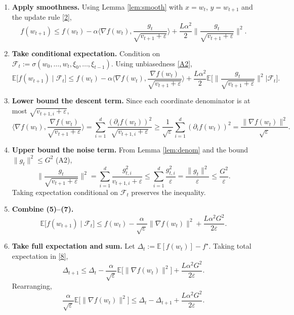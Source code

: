 \documentclass{article}
\newcommand{\E}{\mathbb{E}}
\begin{document}
\begin{enumerate}[label=[Step \arabic*], leftmargin=*, nosep]
\item \textbf{Apply smoothness.}  
Using Lemma \ref{lem:smooth} with $x=w_t$, $y=w_{t+1}$ and the update rule \eqref{2},
\[
f(w_{t+1})\le f(w_t)-\alpha\Big\langle\nabla f(w_t),\frac{g_t}{\sqrt{v_{t+1}+\varepsilon}}\Big\rangle
+\frac{L\alpha^2}{2}\Big\|\frac{g_t}{\sqrt{v_{t+1}+\varepsilon}}\Big\|^2.
\tag{4}
\]

\item \textbf{Take conditional expectation.}  
Condition on $\mathcal{F}_t:=\sigma(w_0,\dots,w_t,\xi_0,\dots,\xi_{t-1})$.
Using unbiasedness \eqref{A2},
\[
\E\!\big[f(w_{t+1})\mid\mathcal{F}_t\big]
\le f(w_t)-\alpha\Big\langle\nabla f(w_t),\frac{\nabla f(w_t)}{\sqrt{v_{t+1}+\varepsilon}}\Big\rangle
+\frac{L\alpha^2}{2}\E\!\Big[\Big\|\frac{g_t}{\sqrt{v_{t+1}+\varepsilon}}\Big\|^2\Big|\mathcal{F}_t\Big].
\tag{5}
\]

\item \textbf{Lower bound the descent term.}  
Since each coordinate denominator is at most $\sqrt{v_{t+1,i}+\varepsilon}$,
\[
\Big\langle\nabla f(w_t),\frac{\nabla f(w_t)}{\sqrt{v_{t+1}+\varepsilon}}\Big\rangle
= \sum_{i=1}^d \frac{(\partial_i f(w_t))^2}{\sqrt{v_{t+1,i}+\varepsilon}}
\ge \frac{1}{\sqrt{\varepsilon}}\sum_{i=1}^d (\partial_i f(w_t))^2
= \frac{\|\nabla f(w_t)\|^2}{\sqrt{\varepsilon}}.
\tag{6}
\]

\item \textbf{Upper bound the noise term.}  
From Lemma \ref{lem:denom} and the bound $\|g_t\|^2\le G^2$ (A2),
\[
\Big\|\frac{g_t}{\sqrt{v_{t+1}+\varepsilon}}\Big\|^2
= \sum_{i=1}^d \frac{g_{t,i}^2}{v_{t+1,i}+\varepsilon}
\le \sum_{i=1}^d \frac{g_{t,i}^2}{\varepsilon}
= \frac{\|g_t\|^2}{\varepsilon}
\le \frac{G^2}{\varepsilon}.
\tag{7}
\]
Taking expectation conditional on $\mathcal{F}_t$ preserves the inequality.

\item \textbf{Combine (5)–(7).}  
\[
\E\!\big[f(w_{t+1})\mid\mathcal{F}_t\big]
\le f(w_t)-\frac{\alpha}{\sqrt{\varepsilon}}\|\nabla f(w_t)\|^2
+\frac{L\alpha^2 G^2}{2\varepsilon}.
\tag{8}
\]

\item \textbf{Take full expectation and sum.}  
Let $\Delta_t:=\E[f(w_t)]-f^\star$.  Taking total expectation in \eqref{8},
\[
\Delta_{t+1}\le \Delta_t-\frac{\alpha}{\sqrt{\varepsilon}}\E\!\big[\|\nabla f(w_t)\|^2\big]
+\frac{L\alpha^2 G^2}{2\varepsilon}.
\tag{9}
\]
Rearranging,
\[
\frac{\alpha}{\sqrt{\varepsilon}}\E\!\big[\|\nabla f(w_t)\|^2\big]
\le \Delta_t-\Delta_{t+1}+\frac{L\alpha^2 G^2}{2\varepsilon}.
\tag{10}
\]


\end{enumerate}
\end{document}
